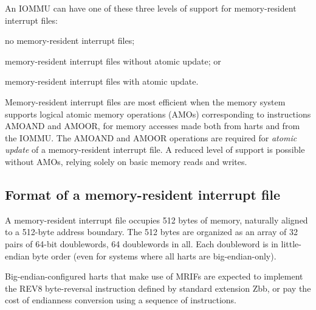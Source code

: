 An \mbox{IOMMU} can have one of these three levels of support for
memory-resident interrupt files:
\begin{tightList}
\item no memory-resident interrupt files;
\item memory-resident interrupt files without atomic update; or
\item memory-resident interrupt files with atomic update.
\end{tightList}

Memory-resident interrupt files are most efficient when the memory
system supports logical atomic memory operations (AMOs) corresponding
to {\RISCV} instructions AMOAND and AMOOR, for memory accesses made
both from harts and from the \mbox{IOMMU}.
The AMOAND and AMOOR operations are required for \emph{atomic update}
of a memory-resident interrupt file.
A reduced level of support is possible without AMOs, relying solely on
basic memory reads and writes.

\subsection{Format of a memory-resident interrupt file}
\label{sec:IOMMU-MRIFFormat}

A memory-resident interrupt file occupies 512 bytes of memory,
naturally aligned to a \mbox{512-byte} address boundary.
The 512 bytes are organized as an array of 32 pairs of \mbox{64-bit}
doublewords, 64 doublewords in all.
Each doubleword is in little-endian byte order (even for systems where
all harts are big-endian-only).

\begin{commentary}
Big-endian-configured harts that make use of MRIFs are expected to
implement the REV8 byte-reversal instruction defined by
standard {\RISCV} extension Zbb, or pay the cost of endianness
conversion using a sequence of instructions.
\end{commentary}

